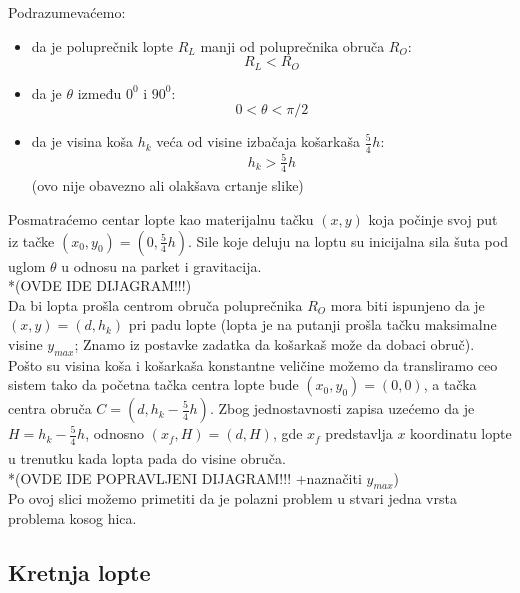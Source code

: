 \documentclass[a4paper, 12pt]{article}
\begin{document}
Podrazumevaćemo:
\begin{itemize}

\item da je poluprečnik lopte $R_L$ manji od poluprečnika obruča $R_O$:
\[R_L<R_O\] %

\item da je $\theta$ između $0^0$ i $90^0$:\\
\[0 < \theta < \pi/2\]

\item da je visina koša $h_k$ veća od visine izbačaja košarkaša $\dfrac{_5}{^4}h$:\\
\[h_k > \dfrac{_5}{^4}h\]  %
(ovo nije obavezno ali olakšava crtanje slike)\\

\end{itemize}



Posmatraćemo centar lopte kao materijalnu tačku $(x,y)$ koja počinje svoj put iz tačke $(x_0,y_0) = (0,\dfrac{_5}{^4}h)$. Sile koje deluju na loptu su inicijalna sila šuta pod uglom $\theta$ u odnosu na parket i gravitacija.\\

*(OVDE IDE DIJAGRAM!!!)\\

Da bi lopta prošla centrom obruča poluprečnika $R_O$ mora biti ispunjeno da je $(x,y) = (d,h_k)$ pri padu lopte (lopta je na putanji prošla tačku maksimalne visine $y_{max}$;
Znamo iz postavke zadatka da košarkaš može da dobaci obruč).\\

Pošto su visina koša i košarkaša konstantne veličine možemo da transliramo ceo sistem tako da početna tačka centra lopte bude $(x_0,y_0) = (0,0)$, a tačka centra obruča $C = (d,h_k-\dfrac{_5}{^4}h)$.
Zbog jednostavnosti zapisa uzećemo da je $H = h_k-\dfrac{_5}{^4}h$, odnosno $(x_f,H) = (d,H)$, gde $x_f$ predstavlja $x$ koordinatu lopte u trenutku kada lopta pada do visine obruča.\\


*(OVDE IDE POPRAVLJENI DIJAGRAM!!! +naznačiti $y_{max}$)\\

Po ovoj slici možemo primetiti da je polazni problem u stvari jedna vrsta problema kosog hica.

\subsection{Kretnja lopte}
\end{document}
